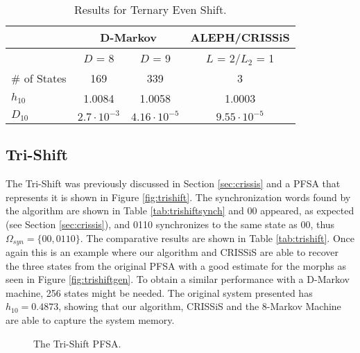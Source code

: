 {\begin{table}
\centering
\caption{Results for Ternary Even Shift. \label{tab:ternaryeven}}
\begin{tabular}{|l|c|c|c|}
\hline
 & \multicolumn{2}{c|}{D-Markov} & ALEPH/CRISSiS\\
 \hline
 & $D$ = 8 & $D$ = 9 &  $L$ = 2/$L_2$ = 1 \\
\hline
\# of States & 169 & 339 & 3 \\ 
$h_{10}$ & 1.0084 & 1.0058 & 1.0003 \\
$D_{10}$ & $2.7\cdot10^{-3}$ & $4.16\cdot10^{-5}$ & $9.55\cdot10^{-5}$ \\
 \hline
\end{tabular}
\end{table}

\subsection{Tri-Shift}

The Tri-Shift was previously discussed in Section \ref{sec:crissis} and a PFSA that represents it is shown in Figure \ref{fig:trishift}. The synchronization words found by the algorithm are shown in Table \ref{tab:trishiftsynch} and 00 appeared, as expected (see Section \ref{sec:crissis}), and 0110 synchronizes to the same state as 00, thus $\Omega_{syn} = \{00, 0110\}$. The comparative results are shown in Table \ref{tab:trishift}. Once again this is an example where our algorithm and CRISSiS are able to recover the three states from the original PFSA with a good estimate for the morphs as seen in Figure \ref{fig:trishiftgen}. To obtain a similar performance with a D-Markov machine, 256 states might be needed. The original system presented has $h_{10} = 0.4873$, showing that our algorithm, CRISSiS and the 8-Markov Machine are able to capture the system memory.

\begin{figure}
\centering
{}
\caption{The Tri-Shift PFSA.\label{fig:trishift_again}}
\end{figure}

}
